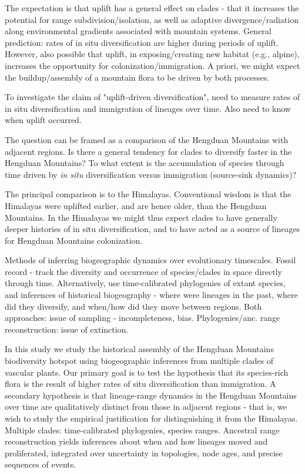 The expectation is that uplift has a general effect on clades - that it increases the potential for range subdivision/isolation, as well as adaptive divergence/radiation along environmental gradients associated with mountain systems. General prediction: rates of in situ diversification are higher during periods of uplift. However, also possible that uplift, in exposing/creating new habitat (e.g., alpine), increases the opportunity for colonization/immigration. A priori, we might expect the buildup/assembly of a mountain flora to be driven by both processes.

To investigate the claim of "uplift-driven diversification", need to measure rates of in situ diversification and immigration of lineages over time. Also need to know when uplift occurred.

The question can be framed as a comparison of the Hengduan Mountains with adjacent regions. Is there a general tendency for clades to diversify faster in the Hengduan Mountains? To what extent is the accumulation of species through time driven by \textit{in situ} diversification versus immigration (source-sink dynamics)?

The principal comparison is to the Himalayas. Conventional wisdom is that the Himalayas were uplifted earlier, and are hence older, than the Hengduan Mountains. In the Himalayas we might thus expect clades to have generally deeper histories of in situ diversification, and to have acted as a source of lineages for Hengduan Mountains colonization.

Methods of inferring biogeographic dynamics over evolutionary timescales. Fossil record - track the diversity and occurrence of species/clades in space directly through time. Alternatively, use time-calibrated phylogenies of extant species, and inferences of historical biogeography - where were lineages in the past, where did they diversify, and when/how did they move between regions. Both approaches: issue of sampling - incompleteness, bias. Phylogenies/anc. range reconstruction: issue of extinction.

In this study we study the historical assembly of the Hengduan Mountains biodiversity hotspot using biogeographic inferences from multiple clades of vascular plants. Our primary goal is to test the hypothesis that its species-rich flora is the result of higher rates of situ diversification than immigration. A secondary hypothesis is that lineage-range dynamics in the Hengduan Mountains over time are qualitatively distinct from those in adjacent regions - that is, we wish to study the empirical justification for distinguishing it from the Himalayas. Multiple clades: time-calibrated phylogenies, species ranges. Ancestral range reconstruction yields inferences about when and how lineages moved and proliferated, integrated over uncertainty in topologies, node ages, and precise sequences of events.